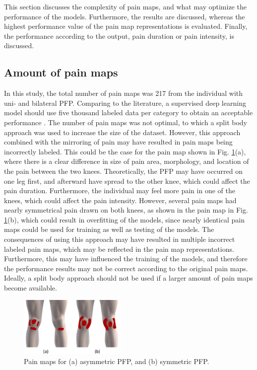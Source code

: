 This section discusses the complexity of pain maps, and what may optimize the performance of the models. Furthermore, the results are discussed, whereas the highest performance value of the pain map representations is evaluated. Finally, the performance according to the output, pain duration or pain intensity, is discussed.

\subsection{Amount of pain maps}
In this study, the total number of pain maps was 217 from the individual with uni- and bilateral PFP. Comparing to the literature, a supervised deep learning model should use five thousand labeled data per category to obtain an acceptable performance \citep{Goodfellow2016}.
\noindent
The number of pain maps was not optimal, to which a split body approach was used to increase the size of the dataset. However, this approach combined with the mirroring of pain may have resulted in pain maps being incorrectly labeled. This could be the case for the pain map shown in Fig. \ref{fig:bipainmap}(a), where there is a clear difference in size of pain area, morphology, and location of the pain between the two knees. Theoretically, the PFP may have occurred on one leg first, and afterward have spread to the other knee, which could affect the pain duration. Furthermore, the individual may feel more pain in one of the knees, which could affect the pain intensity.
However, several pain maps had nearly symmetrical pain drawn on both knees, as shown in the pain map in Fig. \ref{fig:bipainmap}(b), which could result in overfitting of the models, since nearly identical pain maps could be used for training as well as testing of the models.\newline
\noindent
The consequences of using this approach may have resulted in multiple incorrect labeled pain maps, which may be reflected in the pain map representations. Furthermore, this may have influenced the training of the models, and therefore the performance results may not be correct according to the original pain maps. Ideally, a split body approach should not be used if a larger amount of pain maps become available.

\begin{figure}[H]
\centering
\includegraphics[width=0.46\textwidth]{Figures/Simmetry}
\caption{Pain maps for (a) asymmetric PFP, and (b) symmetric PFP.}
\label{fig:bipainmap}
\end{figure}

